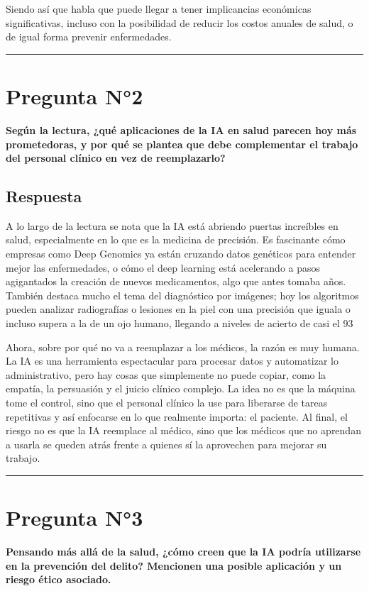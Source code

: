 \documentclass[12pt,a4paper]{article}
\begin{document}
Siendo así que habla que puede llegar a tener implicancias económicas significativas, incluso con la posibilidad de reducir los costos anuales de salud, o de igual forma prevenir enfermedades.


\vspace{0.5cm}
\hrule
\vspace{0.5cm}

\section*{Pregunta N°2}
\textbf{Según la lectura, ¿qué aplicaciones de la IA en salud parecen hoy más prometedoras, y por qué se plantea que debe complementar el trabajo del personal clínico en vez de reemplazarlo?}

\subsection*{Respuesta}

A lo largo de la lectura se nota que la IA está abriendo puertas increíbles en salud, especialmente en lo que es la medicina de precisión. Es fascinante cómo empresas como Deep Genomics ya están cruzando datos genéticos para entender mejor las enfermedades, o cómo el deep learning está acelerando a pasos agigantados la creación de nuevos medicamentos, algo que antes tomaba años. También destaca mucho el tema del diagnóstico por imágenes; hoy los algoritmos pueden analizar radiografías o lesiones en la piel con una precisión que iguala o incluso supera a la de un ojo humano, llegando a niveles de acierto de casi el 93%

Ahora, sobre por qué no va a reemplazar a los médicos, la razón es muy humana. La IA es una herramienta espectacular para procesar datos y automatizar lo administrativo, pero hay cosas que simplemente no puede copiar, como la empatía, la persuasión y el juicio clínico complejo. La idea no es que la máquina tome el control, sino que el personal clínico la use para liberarse de tareas repetitivas y así enfocarse en lo que realmente importa: el paciente. Al final, el riesgo no es que la IA reemplace al médico, sino que los médicos que no aprendan a usarla se queden atrás frente a quienes sí la aprovechen para mejorar su trabajo.

\vspace{0.5cm}
\hrule
\vspace{0.5cm}

\section*{Pregunta N°3}
\textbf{Pensando más allá de la salud, ¿cómo creen que la IA podría utilizarse en la prevención del delito? Mencionen una posible aplicación y un riesgo ético asociado.}
\end{document}
